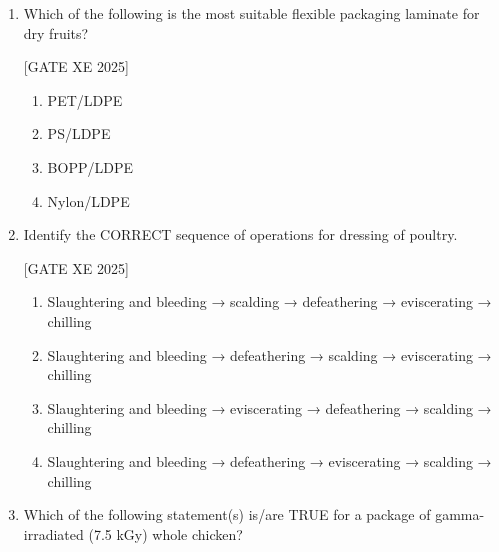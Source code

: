 \documentclass[journal,12pt,onecolumn]{IEEEtran}
\theoremstyle{remark}
\begin{document}
\begin{enumerate}
Assume: $t_p$ = processor’s process time; $t_c$ = come-up time

\hfill[GATE XE 2025]

\begin{multicols}{2}
\begin{enumerate}
\item $B = t_p + 0.42\, t_c$
\item $B = t_p + 0.30\, t_c$
\item $B = t_p + 0.50\, t_c$
\item $B = t_p + 0.25\, t_c$
\end{enumerate}
\end{multicols}

\item Which of the following is the most suitable flexible packaging laminate for dry fruits?

\hfill[GATE XE 2025]

\begin{multicols}{2}
\begin{enumerate}
\item PET/LDPE
\item PS/LDPE
\item BOPP/LDPE
\item Nylon/LDPE
\end{enumerate}
\end{multicols}

\item Identify the CORRECT sequence of operations for dressing of poultry.

\hfill[GATE XE 2025]

\begin{multicols}{2}
\begin{enumerate}
\item Slaughtering and bleeding → scalding → defeathering → eviscerating → chilling
\item Slaughtering and bleeding → defeathering → scalding → eviscerating → chilling
\item Slaughtering and bleeding → eviscerating → defeathering → scalding → chilling
\item Slaughtering and bleeding → defeathering → eviscerating → scalding → chilling
\end{enumerate}
\end{multicols}

\item Which of the following statement(s) is/are TRUE for a package of gamma-irradiated (7.5 kGy) whole chicken?


\end{enumerate}
\end{document}
